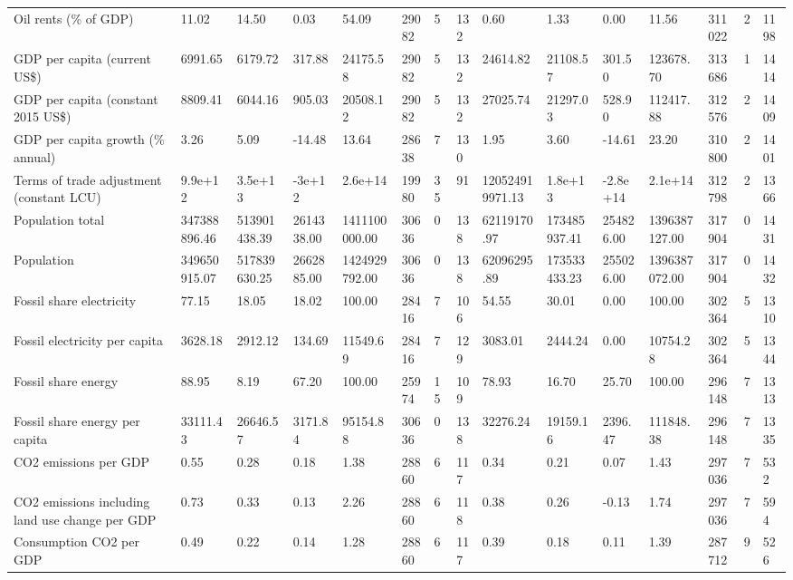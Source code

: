 \begin{longtable}{lllllllllllllll}
Oil rents (\% of GDP) & 11.02 & 14.50 & 0.03 & 54.09 & 29082 & 5 & 132 & 0.60 & 1.33 & 0.00 & 11.56 & 311022 & 2 & 1198\\
GDP per capita (current US\$) & 6991.65 & 6179.72 & 317.88 & 24175.58 & 29082 & 5 & 132 & 24614.82 & 21108.57 & 301.50 & 123678.70 & 313686 & 1 & 1414\\
GDP per capita (constant 2015 US\$) & 8809.41 & 6044.16 & 905.03 & 20508.12 & 29082 & 5 & 132 & 27025.74 & 21297.03 & 528.90 & 112417.88 & 312576 & 2 & 1409\\
\addlinespace
GDP per capita growth (\% annual) & 3.26 & 5.09 & -14.48 & 13.64 & 28638 & 7 & 130 & 1.95 & 3.60 & -14.61 & 23.20 & 310800 & 2 & 1401\\
Terms of trade adjustment (constant LCU) & 9.9e+12 & 3.5e+13 & -3e+12 & 2.6e+14 & 19980 & 35 & 91 & 120524919971.13 & 1.8e+13 & -2.8e+14 & 2.1e+14 & 312798 & 2 & 1366\\
Population total & 347388896.46 & 513901438.39 & 2614338.00 & 1411100000.00 & 30636 & 0 & 138 & 62119170.97 & 173485937.41 & 254826.00 & 1396387127.00 & 317904 & 0 & 1431\\
Population & 349650915.07 & 517839630.25 & 2662885.00 & 1424929792.00 & 30636 & 0 & 138 & 62096295.89 & 173533433.23 & 255026.00 & 1396387072.00 & 317904 & 0 & 1432\\
Fossil share electricity & 77.15 & 18.05 & 18.02 & 100.00 & 28416 & 7 & 106 & 54.55 & 30.01 & 0.00 & 100.00 & 302364 & 5 & 1310\\
\addlinespace
Fossil electricity per capita & 3628.18 & 2912.12 & 134.69 & 11549.69 & 28416 & 7 & 129 & 3083.01 & 2444.24 & 0.00 & 10754.28 & 302364 & 5 & 1344\\
Fossil share energy & 88.95 & 8.19 & 67.20 & 100.00 & 25974 & 15 & 109 & 78.93 & 16.70 & 25.70 & 100.00 & 296148 & 7 & 1313\\
Fossil share energy per capita & 33111.43 & 26646.57 & 3171.84 & 95154.88 & 30636 & 0 & 138 & 32276.24 & 19159.16 & 2396.47 & 111848.38 & 296148 & 7 & 1335\\
CO2 emissions per GDP & 0.55 & 0.28 & 0.18 & 1.38 & 28860 & 6 & 117 & 0.34 & 0.21 & 0.07 & 1.43 & 297036 & 7 & 532\\
CO2 emissions including land use change per GDP & 0.73 & 0.33 & 0.13 & 2.26 & 28860 & 6 & 118 & 0.38 & 0.26 & -0.13 & 1.74 & 297036 & 7 & 594\\
\addlinespace
Consumption CO2 per GDP & 0.49 & 0.22 & 0.14 & 1.28 & 28860 & 6 & 117 & 0.39 & 0.18 & 0.11 & 1.39 & 287712 & 9 & 526\\

\end{longtable}
